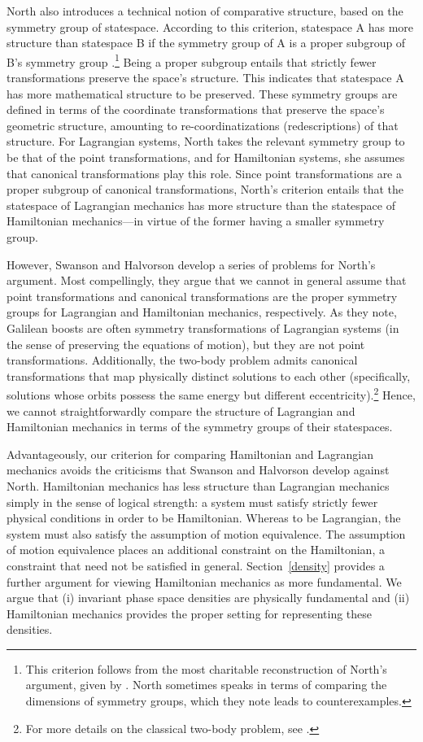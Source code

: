 \documentclass[12pt, english, twoside]{article} %
\begin{document}
North also introduces a technical notion of comparative structure, based on the symmetry group of statespace. According to this criterion, statespace A has more structure than statespace B if the symmetry group of A is a proper subgroup of B's symmetry group \parencites[87-88]{North}.\footnote{This criterion follows from the most charitable reconstruction of North's argument, given by \textcites[]{Swanson}. North sometimes speaks in terms of comparing the dimensions of symmetry groups, which they note leads to counterexamples.} Being a proper subgroup entails that strictly fewer transformations preserve the space's structure. This indicates that statespace A has more mathematical structure to be preserved. These symmetry groups are defined in terms of the coordinate transformations that preserve the space's geometric structure, amounting to re-coordinatizations (redescriptions) of that structure. For Lagrangian systems, North takes the relevant symmetry group to be that of the point transformations, and for Hamiltonian systems, she assumes that canonical transformations play this role. Since point transformations are a proper subgroup of canonical transformations, North's criterion entails that the statespace of Lagrangian mechanics has more structure than the statespace of Hamiltonian mechanics---in virtue of the former having a smaller symmetry group. 

However, Swanson and Halvorson \parencites*[]{Swanson} develop a series of problems for North's argument. Most compellingly, they argue that we cannot in general assume that point transformations and canonical transformations are the proper symmetry groups for Lagrangian and Hamiltonian mechanics, respectively. As they note, Galilean boosts are often symmetry transformations of Lagrangian systems (in the sense of preserving the equations of motion), but they are not point transformations. Additionally, the two-body problem admits canonical transformations that map physically distinct solutions to each other (specifically, solutions whose orbits possess the same energy but different eccentricity).\footnote{For more details on the classical two-body problem, see \textcites[]{Belot}.} Hence, we cannot straightforwardly compare the structure of Lagrangian and Hamiltonian mechanics in terms of the symmetry groups of their statespaces. 

Advantageously, our criterion for comparing Hamiltonian and Lagrangian mechanics avoids the criticisms that Swanson and Halvorson develop against North. Hamiltonian mechanics has less structure than Lagrangian mechanics simply in the sense of logical strength: a system must satisfy strictly fewer physical conditions in order to be Hamiltonian. Whereas to be Lagrangian, the system must also satisfy the assumption of motion equivalence. The assumption of motion equivalence places an additional constraint on the Hamiltonian, a constraint that need not be satisfied in general. Section~\ref{density} provides a further argument for viewing Hamiltonian mechanics as more fundamental. We argue that (i) invariant phase space densities are physically fundamental and (ii) Hamiltonian mechanics provides the proper setting for representing these densities.
\end{document}
